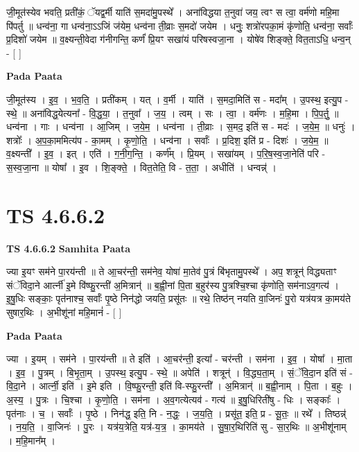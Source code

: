 \documentclass[17pt]{extarticle}
\begin{document}
जी॒मूत॑स्येव भवति॒ प्रती॑कं॒ ॅयद्व॒र्मी याति॑ स॒मदा॑मु॒पस्थे᳚ । अना॑विद्धया त॒नुवा॑ जय॒ त्वꣳ स त्वा॒ वर्म॑णो महि॒मा पि॑पर्तु ॥ धन्व॑ना॒ गा धन्व॑ना॒ऽऽजिं ज॑येम॒ धन्व॑ना ती॒व्राः स॒मदो॑ जयेम । धनुः॒ शत्रो॑रपका॒मं कृ॑णोति॒ धन्व॑ना॒ सर्वाः᳚ प्र॒दिशो॑ जयेम ॥ व॒क्ष्यन्ती॒वेदा ग॑नीगन्ति॒ कर्णं॑ प्रि॒यꣳ सखा॑यं परिषस्वजा॒ना । योषे॑व शिङ्क्ते॒ वित॒ताऽधि॒ धन्व॒न् - [  ] \newline

\textbf{Pada Paata} \newline

जी॒मूत॑स्य । इ॒व॒ । भ॒व॒ति॒ । प्रती॑कम् । यत् । व॒र्मी । याति॑ । स॒मदा॒मिति॑ स - मदा᳚म् । उ॒पस्थ॒ इत्यु॒प - स्थे॒ ॥ अना॑विद्ध॒येत्यना᳚ - वि॒द्ध॒या॒ । त॒नुवा᳚ । ज॒य॒ । त्वम् । सः । त्वा॒ । वर्म॑णः । म॒हि॒मा । पि॒प॒र्तु॒ ॥ धन्व॑ना । गाः । धन्व॑ना । आ॒जिम् । ज॒ये॒म॒ । धन्व॑ना । ती॒व्राः । स॒मद॒ इति॑ स - मदः॑ । ज॒ये॒म॒ ॥ धनुः॑ । शत्रोः᳚ । अ॒प॒का॒ममित्य॑प - का॒मम् । कृ॒णो॒ति॒ । धन्व॑ना । सर्वाः᳚ । प्र॒दिश॒ इति॑ प्र - दिशः॑ । ज॒ये॒म॒ ॥ व॒क्ष्यन्ती᳚ । इ॒व॒ । इत् । एति॑ । ग॒नी॒ग॒न्ति॒ । कर्ण᳚म् । प्रि॒यम् । सखा॑यम् । प॒रि॒ष॒स्व॒जा॒नेति॑ परि - स॒स्व॒जा॒ना ॥ योषा᳚ । इ॒व । शि॒ङ्क्ते॒ । वित॒तेति॒ वि - त॒ता॒ । अधीति॑ । धन्वन्न्॑ ।  \newline





\section{ TS 4.6.6.2 }

\textbf{TS 4.6.6.2 } \newline
\textbf{Samhita Paata} \newline

ज्या इ॒यꣳ सम॑ने पा॒रय॑न्ती ॥ ते आ॒चर॑न्ती॒ सम॑नेव॒ योषा॑ मा॒तेव॑ पु॒त्रं बि॑भृतामु॒पस्थे᳚ । अप॒ शत्रून्॑ विद्ध्यताꣳ संॅविदा॒ने आर्त्नी॑ इ॒मे वि॑ष्फु॒रन्ती॑ अ॒मित्रान्॑ ॥ ब॒ह्वी॒नां पि॒ता ब॒हुर॑स्य पु॒त्रश्चि॒श्चा कृ॑णोति॒ सम॑नाऽव॒गत्य॑ । इ॒षु॒धिः सङ्काः॒ पृत॑नाश्च॒ सर्वाः᳚ पृ॒ष्ठे निन॑द्धो जयति॒ प्रसू॑तः ॥ रथे॒ तिष्ठ॑न् नयति वा॒जिनः॑ पु॒रो यत्र॑यत्र का॒मय॑ते सुषार॒थिः । अ॒भीशू॑नां महि॒मानं॑ - [  ] \newline

\textbf{Pada Paata} \newline

ज्या । इ॒यम् । सम॑ने । पा॒रय॑न्ती ॥ ते इति॑ । आ॒चर॑न्ती॒ इत्या᳚ - चर॑न्ती । सम॑ना । इ॒व॒ । योषा᳚ । मा॒ता । इ॒व॒ । पु॒त्रम् । बि॒भृ॒ता॒म् । उ॒पस्थ॒ इत्यु॒प - स्थे॒ ॥ अपेति॑ । शत्रून्॑ । वि॒द्ध्य॒ता॒म् । सं॒ॅवि॒दा॒न इति॑ सं - वि॒दा॒ने । आर्त्नी॒ इति॑ । इ॒मे इति । वि॒ष्फु॒रन्ती॒ इति॑ वि-स्फु॒रन्ती᳚ । अ॒मित्रान्॑ ॥ ब॒ह्वी॒नाम् । पि॒ता । ब॒हुः । अ॒स्य॒ । पु॒त्रः । चि॒श्चा । कृ॒णो॒ति॒ । सम॑ना । अ॒व॒गत्येत्यव॑ - गत्य॑ ॥ इ॒षु॒धिरिती॑षु - धिः । सङ्काः᳚ । पृत॑नाः । च॒ । सर्वाः᳚ । पृ॒ष्ठे । निन॑द्ध॒ इति॒ नि - न॒द्धः॒ । ज॒य॒ति॒ । प्रसू॑त॒ इति॒ प्र - सू॒तः॒ ॥ रथे᳚ । तिष्ठन्न्॑ । न॒य॒ति॒ । वा॒जिनः॑ । पु॒रः । यत्र॑य॒त्रेति॒ यत्र॑-य॒त्र॒ । का॒मय॑ते । सु॒षा॒र॒थिरिति॑ सु - सा॒र॒थिः ॥ अ॒भीशू॑नाम् । म॒हि॒मान᳚म् ।  \newline
\end{document}
